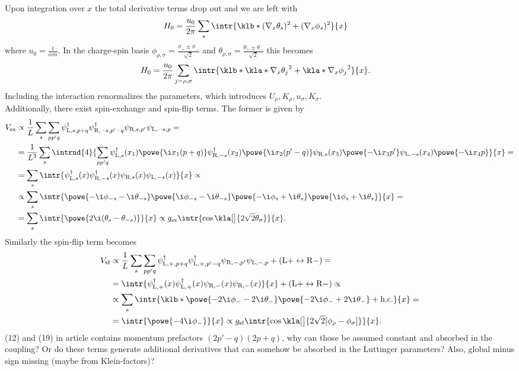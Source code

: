 \documentclass[english, parskip=full]{scrartcl}
\newcommand{\R}{\text{R}}
\renewcommand{\L}{\text{L}}
\newcommand{\TODO}[1]{\color{red!60!black} #1\color{black}}
\begin{document}
Upon integration over $x$ the total derivative terms drop out and we are left with
\begin{align}
H_0 &= \frac{u_0}{2\pi} \sum_s \intr{ \klb*{ (\nabla_x\theta_s)^2 + (\nabla_x\phi_s)^2 }  }{x}
\end{align}
where $u_0 = \frac{1}{\alpha m}$.
In the charge-spin basis $\phi_{\rho,\sigma} = \frac{\phi_+ \pm \phi_-}{\sqrt{2}}$ and $\theta_{\rho,\sigma} = \frac{\theta_+ \pm \theta_-}{\sqrt{2}}$ this becomes
\begin{align}
H_0 &= \frac{u_0}{2\pi} \sum_{j=\rho,\sigma} \intr{ \klb*{\kla*{\nabla_x\theta_j}^2 + \kla*{\nabla_x\phi_j}^2} }{x}.
\end{align}
\TODO{Including the interaction renormalizes the parameters, which introduces $U_\rho, K_\rho, u_\sigma, K_\sigma$.}\\
Additionally, there exist spin-exchange and spin-flip terms.
The former is given by
\begin{align}
V_\text{sx} &\propto \frac{1}{L}\sum_s \sum_{pp'q} \psi_{\L, s,p+q}^\dagger \psi_{\R, -s,p'-q}^\dagger \psi_{\R, s,p'} \psi_{\L, -s,p} = \\
&= \frac{1}{L^3} \sum_s \intrnd{4}{ \sum_{pp'q} \psi_{\L, s}^\dagger (x_1) \powe{\i x_1(p+q)} \psi_{\R, -s}^\dagger(x_2) \powe{\i x_2(p'-q)} \psi_{\R, s}(x_3) \powe{-\i x_3p'} \psi_{\L, -s}(x_4) \powe{-\i x_4 p} }{x} = \\
&= \sum_s \intr{\psi_{\L, s}^\dagger (x) \psi_{\R, -s}^\dagger(x) \psi_{\R, s}(x) \psi_{\L, -s}(x)}{x} \propto \\
&\propto \sum_s \intr{ \powe{-\i\phi_{-s} - \i\theta_{-s}} \powe{\i\phi_{-s} - \i\theta_{-s}} \powe{-\i\phi_s + \i\theta_s} \powe{\i\phi_s + \i\theta_s} }{x} = \\
&= \sum_s \intr{ \powe{2\i (\theta_s - \theta_{-s})}}{x} \propto g_\text{sx} \intr{\cos \kla[\big]{2\sqrt{2}\theta_\sigma} }{x}.
\end{align}
Similarly the spin-flip term becomes
\begin{align}
V_\text{sf} &\propto \frac{1}{L} \sum_s \sum_{pp'q} \psi_{\L, +,p+q}^\dagger \psi_{\L, +,p'-q}^\dagger \psi_{\R, -,p'} \psi_{\L, -,p} + (\L+ \leftrightarrow \R-) = \\
&= \intr{\psi_{\L, +}^\dagger (x) \psi_{\L, +}^\dagger(x) \psi_{\R, -}(x) \psi_{\R, -}(x)}{x} + (\L+ \leftrightarrow \R-) \propto \\
&\propto \sum_s \intr{ \klb*{\powe{-2\i\phi_{-} - 2\i\theta_{-}} \powe{-2\i\phi_- + 2\i\theta_- } + \text{h.c.}} }{x} = \\
&= \intr{ \powe{-4\i \phi_-}}{x} \propto g_\text{sf} \intr{\cos \kla[\big]{2\sqrt{2}[\phi_\rho - \phi_\sigma]} }{x}.
\end{align}
\TODO{(12) and (19) in article contains momentum prefactors $(2p'-q)(2p+q)$, why can those be assumed constant and absorbed in the coupling?
Or do these terms generate additional derivatives that can somehow be absorbed in the Luttinger parameters?
Also, global minus sign missing (maybe from Klein-factors)?}



\end{document}
